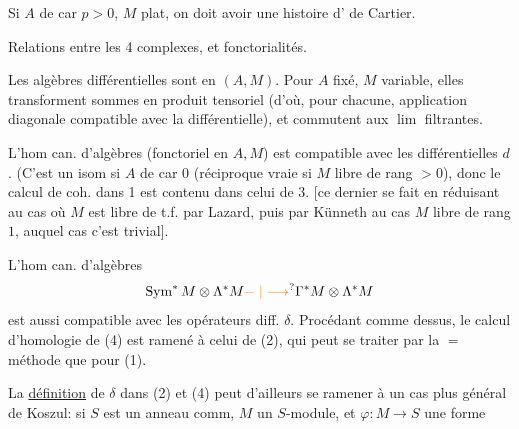 Si $A$ de car $p>0$, $M$ plat, on doit avoir une histoire d' de Cartier.


Relations entre les 4 complexes, et fonctorialités.

Les  algèbres différentielles sont  en $(A,M)$. Pour $A$ fixé, $M$ variable, elles transforment sommes en produit tensoriel (d'où, pour chacune, application diagonale compatible avec  la différentielle), et commutent aux \uline{$\lim$} filtrantes.

L'hom can. d'algèbres (fonctoriel en $A,M$)
est compatible avec les différentielles $d$. (C'est un isom  si $A$ de car $0$ (réciproque vraie si  $M$ libre de rang $>0$), donc le calcul de coh. dans 1 est contenu dans celui de 3. [ce dernier se fait en réduisant au cas où $M$ est libre de t.f. par Lazard, puis par Künneth au cas $M$ libre de rang $1$, auquel cas c'est trivial].

L'hom can. d'algèbres
\[
 \operatorname{Sym}^*M\otimes\Lambda^*M\unsure{\relbar|\longrightarrow}\Gamma^*M\otimes\Lambda^*M
\]
est aussi compatible avec les opérateurs diff. $\delta$.   Procédant comme dessus, le calcul d'homologie de (4) est ramené à celui de (2), qui peut se traiter par la $=$ méthode que pour (1).

La \uline{définition} de  $\delta$ dans (2) et (4) peut d'ailleurs se ramener à un cas plus général de Koszul: si $S$ est un anneau comm, $M$ un $S$-module,  et $\varphi\colon M\to S$ une forme


